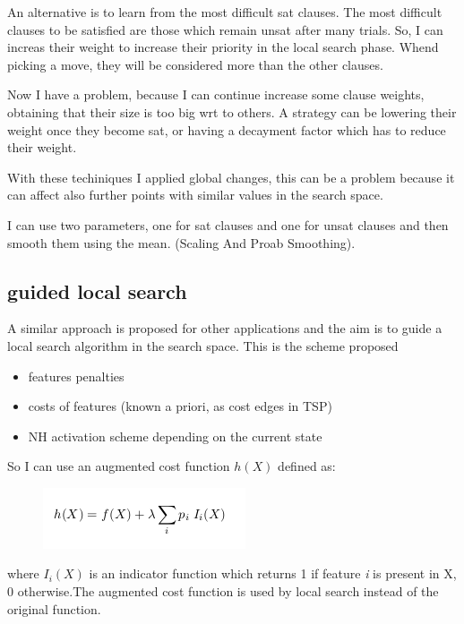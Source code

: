 \documentclass[10pt]{article}
\begin{document}
An alternative is to learn from the most difficult sat clauses. The most difficult clauses to be satisfied are those which remain unsat after many trials. So, I can increas their weight to increase their priority in the local search phase. Whend picking a move, they will be considered more than the other clauses. 

Now I have a problem, because I can continue increase some clause weights, obtaining that their size is too big wrt to others. A strategy can be lowering their weight once they become sat, or having a decayment factor which has to reduce their weight. 

With these techiniques I applied global changes, this can be a problem because it can affect also further points with similar values in the search space.

I can use two parameters, one for sat clauses and one for unsat clauses and then smooth them using the mean. (Scaling And Proab Smoothing).

\subsection{guided local search}
A similar approach is proposed for other applications and the aim is to guide a local search algorithm in the search space. 
This is the scheme proposed

\begin{itemize}
\item features penalties
\item costs of features (known a priori, as cost edges in TSP)
\item NH activation scheme depending on the current state 
\end{itemize}

So I can use an augmented cost function $ h(X) $ defined as:

\begin{figure}[H]
\includegraphics[scale=0.50]{augmented}
\centering
\end{figure}

where $ I_i(X) $ is an indicator function which returns 1 if feature  \textit{i} is present in X, 0 otherwise.The augmented cost
function is used by local search instead of the original function.
	
\end{document}
